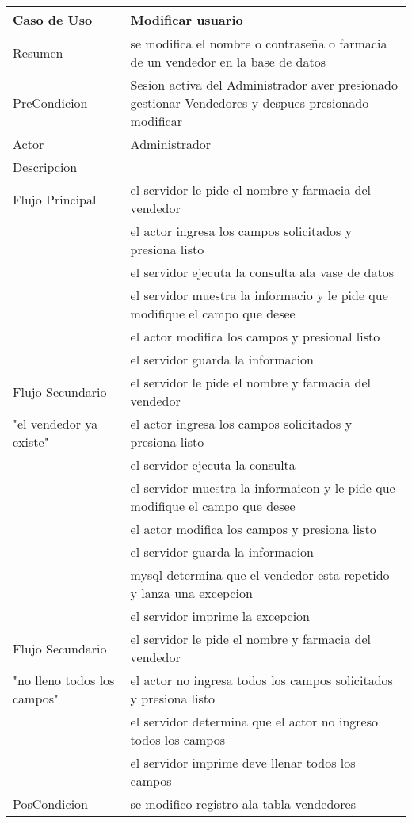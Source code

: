 \documentclass{book}
\begin{document}
	\begin{table}[H]
		\centering
		\begin{tabular}{p{3cm} p{11cm}}
			\hline
				Caso de Uso & Modificar usuario\\
			\hline 
				Resumen & se modifica el nombre o contraseña o farmacia de un vendedor en la base de datos\\
			\hline
				PreCondicion&Sesion activa del Administrador aver presionado gestionar Vendedores y despues presionado modificar\\
			\hline
				Actor & Administrador\\
			\hline
				Descripcion&\\
				Flujo Principal&el servidor le pide el nombre y farmacia del vendedor
					\\&el actor ingresa los campos solicitados y presiona listo
					\\&el servidor ejecuta la consulta ala vase de datos
					\\&el servidor muestra la informacio y le pide que modifique el campo que desee
					\\&el actor modifica los campos y presional listo 
					\\&el servidor guarda la informacion\\
			\hline
				Flujo Secundario&el servidor le pide el nombre y farmacia del vendedor\\
				"el vendedor ya existe"&el actor ingresa los campos solicitados y presiona listo
				\\&el servidor ejecuta la consulta
				\\&el servidor muestra la informaicon y le pide que modifique el campo que desee
				\\&el actor modifica los campos y presiona listo
				\\&el servidor guarda la informacion
				\\&mysql determina que el vendedor esta repetido y lanza una excepcion 
				\\&el servidor imprime la excepcion\\
			\hline
				Flujo Secundario&el servidor le pide el nombre y farmacia del vendedor\\
				"no lleno todos los campos"&el actor no ingresa todos los campos solicitados y presiona listo
				\\&el servidor determina que el actor no ingreso todos los campos
				\\&el servidor imprime deve llenar todos los campos\\
			\hline
				PosCondicion&se modifico registro ala tabla vendedores\\
			\hline
		\end{tabular}
	\end{table}
\end{document}

